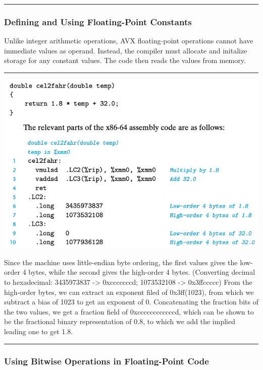 \documentclass[11pt]{article}
\begin{document}
\noindent\rule{\textwidth}{0.5pt}

\subsubsection{Defining and Using Floating-Point Constants}
\label{sec:orge4abf59}
Unlike integer arithmetic operations, AVX floating-point operations cannot have immediate values as operand. Instead, the compiler must allocate and initalize storage for any constant values. The code then reads the values from memory.\\

\noindent\rule{\textwidth}{0.5pt}
\begin{center}
\includegraphics[width=.9\linewidth]{pics/cel2fahr.png}
\end{center}

Since the machine uses little-endian byte ordering, the first values gives the low-order 4 bytes, while the second gives the high-order 4 bytes. (Converting decimal to hexadecimal: 3435973837 -> 0xcccccccd; 1073532108 -> 0x3ffccccc) From the high-order bytes, we can extract an exponent filed of 0x3ff(1023), from which we subtract a bias of 1023 to get an exponent of 0. Concatenating the fraction bits of the two values, we get a fraction field of 0xccccccccccccd, which can be shown to be the fractional binary representation of 0.8, to which we add the implied leading one to get 1.8.\\

\noindent\rule{\textwidth}{0.5pt}

\subsubsection{Using Bitwise Operations in Floating-Point Code}
\label{sec:org8503e1d}
\end{document}
